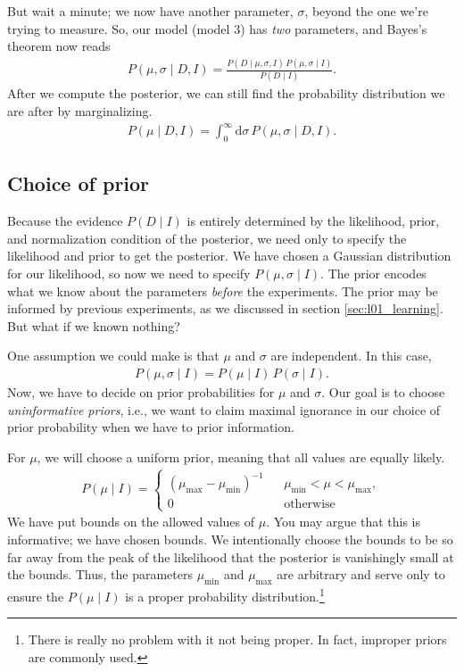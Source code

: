 But wait a minute; we now have another parameter, $\sigma$, beyond the
one we're trying to measure.  So, our model (model 3) has \textit{two}
parameters, and Bayes's theorem now reads
\begin{align}
P(\mu, \sigma \mid D, I) = \frac{P(D\mid \mu, \sigma, I)\,P(\mu, \sigma \mid I)}
{P(D\mid I)}.
\end{align}
After we compute the posterior, we can still find the probability
distribution we are after by marginalizing.
\begin{align}
P(\mu\mid D, I) = \int_0^\infty \mathrm{d}\sigma\,P(\mu, \sigma \mid D, I).
\end{align}


\subsection{Choice of prior}
Because the evidence $P(D\mid I)$ is entirely determined by the
likelihood, prior, and normalization condition of the posterior, we
need only to specify the likelihood and prior to get the posterior.
We have chosen a Gaussian distribution for our likelihood, so now we
need to specify $P(\mu, \sigma \mid I)$.  The prior encodes what we
know about the parameters \textit{before} the experiments.  The prior
may be informed by previous experiments, as we discussed in section
\ref{sec:l01_learning}.  But what if we known nothing?

One assumption we could make is that $\mu$ and $\sigma$ are
independent.  In this case,
\begin{align}
P(\mu, \sigma \mid I) = P(\mu \mid I)\,P(\sigma\mid I).
\end{align}
Now, we have to decide on prior probabilities for $\mu$ and $\sigma$.
Our goal is to choose \textit{uninformative priors}, i.e., we want to
claim maximal ignorance in our choice of prior probability when we
have to prior information.  

For $\mu$, we will choose a uniform prior, meaning that all values are
equally likely.
\begin{align}
P(\mu\mid I) = \left\{\begin{array}{ccl}
\left(\mu_\mathrm{max} - \mu_\mathrm{min}\right)^{-1} & & \mu_\mathrm{min} < \mu < \mu_\mathrm{max}, \\[1em]
0 & & \text{otherwise}
\end{array}\right.
\end{align}
We have put bounds on the allowed values of $\mu$.  You may argue that
this is informative; we have chosen bounds.  We intentionally choose
the bounds to be so far away from the peak of the likelihood that the
posterior is vanishingly small at the bounds.  Thus, the parameters
$\mu_\mathrm{min}$ and $\mu_\mathrm{max}$ are arbitrary and serve only
to ensure the $P(\mu \mid I)$ is a proper probability
distribution.\footnote{There is really no problem with it not being
  proper.  In fact, improper priors are commonly used.}


